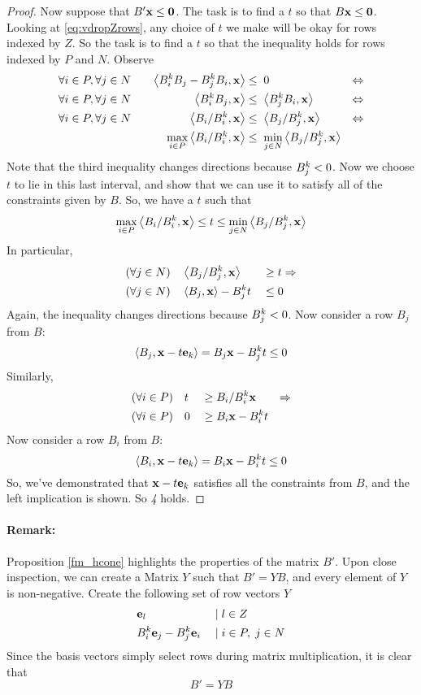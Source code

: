 \begin{proof}
	Now suppose that $B'\mathbf{x} \leq \mathbf{0}$.  The task is to find a $t$ so that $B\mathbf{x} \leq \mathbf{0}$.  Looking at \eqref{eq:vdropZrows}, any choice of $t$ we make will be okay for rows indexed by $Z$.  So the task is to find a $t$ so that the inequality holds for rows indexed by $P$ and $N$.  Observe
	\begin{alignat*}{3}
		\forall i\in P,\forall j \in N & \quad & \left\langle B^k_i B_j - B^k_j B_i, \mathbf{x} \right\rangle    & \leq  \; 0                                & \Leftrightarrow \\
		\forall i\in P,\forall j \in N & \quad & \left\langle B^k_i B_j, \mathbf{x} \right\rangle               & \leq  \; \left\langle B^k_j B_i, \mathbf{x} \right\rangle                & \Leftrightarrow \\
		\forall i\in P,\forall j \in N & \quad & \left\langle B_i/B^k_i, \mathbf{x} \right\rangle               & \leq  \; \left\langle B_j/B^k_j, \mathbf{x} \right\rangle                & \Leftrightarrow \\
		      & \quad & \max_{i\in P} \left\langle B_i/B^k_i, \mathbf{x} \right\rangle & \leq  \; \min_{j\in N}  \left\langle B_j/B^k_j, \mathbf{x} \right\rangle &
	\end{alignat*}
	Note that the third inequality changes directions because $B^k_j < 0$.  Now we choose $t$ to lie in this last interval, and show that we can use it to satisfy all of the constraints given by $ B$.  So, we have a $t$ such that
	\[ \max_{i\in P} \left\langle B_i/B^k_i, \mathbf{x} \right\rangle \leq t \leq \min_{j\in N} \left\langle B_j/B^k_j, \mathbf{x} \right\rangle \]
	In particular,
	\begin{alignat*}{2}
		(\forall j\in N)\quad & \left\langle B_j/B^k_j, \mathbf{x} \right\rangle     \; & \geq & \; t \Rightarrow \\
		(\forall j\in N)\quad & \left\langle B_j, \mathbf{x} \right\rangle - B^k_j t \; & \leq & \; 0
	\end{alignat*}
	Again, the inequality changes directions because $B^k_j < 0$.  Now consider a row $ B_j$ from $ B$:
	\[ \left\langle B_j, \mathbf{x}-t\mathbf{e}_k \right\rangle =  B_j {\mathbf{x}} - B^k_j t \leq 0 \]
	Similarly,
	\begin{alignat*}{3}
		(\forall i\in P)\quad & t \; & \geq & \;  B_i/B^k_i {\mathbf{x}}     & \Rightarrow \\
		(\forall i\in P)\quad & 0 \; & \geq & \;  B_i {\mathbf{x}} - B^k_i t &
	\end{alignat*}
	Now consider a row $ B_i$ from $ B$:
	\[ \left\langle B_i, \mathbf{x}-t\mathbf{e}_k \right\rangle =  B_i {\mathbf{x}} - B^k_i t \leq 0 \]
	So, we've demonstrated that $\mathbf{x}-t\mathbf{e}_k$ satisfies all the constraints from $B$, and the left implication is shown.  So \textit{4} holds.
\end{proof}

\paragraph{Remark:}  \label{rem:fm} Proposition \ref{fm_hcone} highlights the properties of the matrix $B'$.  Upon close inspection, we can create a Matrix $Y$ such that $B' = YB$, and every element of $Y$ is non-negative.  Create the following set of row vectors $Y$
\begin{alignat*}{2}
	 & \mathbf{e}_l                  & \;|\; & l \in Z          \\
	 & B^k_i \mathbf{e}_j - B^k_j \mathbf{e}_i & \;|\; & i\in P,\; j\in N
\end{alignat*}
Since the basis vectors simply select rows during matrix multiplication, it is clear that
\[ B' = YB \]

